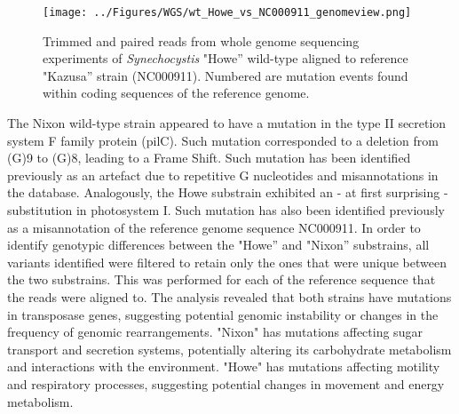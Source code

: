 \documentclass[12pt]{article}
\begin{document}
\begin{figure}[H]
    \centering
    \texttt{[image: ../Figures/WGS/wt\_Howe\_vs\_NC000911\_genomeview.png]}
    \caption{Trimmed and paired reads from whole genome sequencing experiments of \textit{Synechocystis} "Howe'' wild-type aligned to reference "Kazusa'' strain (NC000911). Numbered are mutation events found within coding sequences of the reference genome.}
    \label{fig:WTH_NC000911}
\end{figure}

The Nixon wild-type strain appeared to have a mutation in the type II secretion system F family protein (pilC). Such mutation corresponded to a  deletion from (G)9 to (G)8, leading to a Frame Shift. Such mutation has been identified previously as an artefact due to repetitive G nucleotides and misannotations in the database. Analogously, the Howe substrain exhibited an - at first surprising -  substitution in photosystem I. Such mutation has also been identified previously as a misannotation of the reference genome sequence NC000911. In order to identify genotypic differences between the "Howe'' and "Nixon'' substrains, all variants identified were filtered to retain only the ones that were unique between the two substrains. This was performed for each of the reference sequence that the reads were aligned to. The analysis revealed that both strains have mutations in transposase genes, suggesting potential genomic instability or changes in the frequency of genomic rearrangements.
"Nixon" has mutations affecting sugar transport and secretion systems, potentially altering its carbohydrate metabolism and interactions with the environment.
"Howe" has mutations affecting motility and respiratory processes, suggesting potential changes in movement and energy metabolism.
\end{document}
